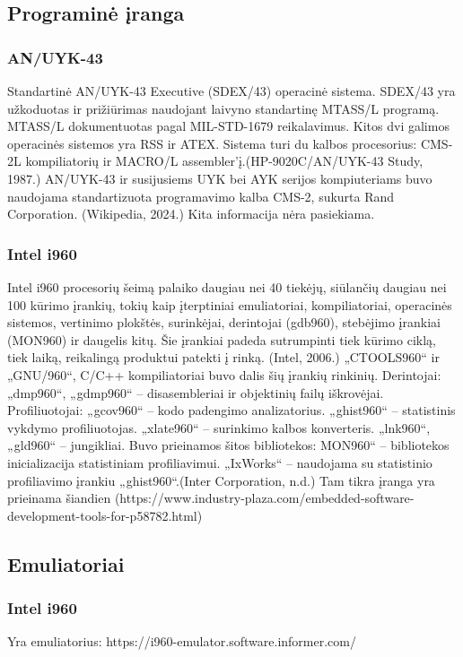 \documentclass{article}
\begin{document}
\subsection{Programinė įranga}
\subsubsection{AN/UYK-43}
Standartinė AN/UYK-43 Executive (SDEX/43) operacinė sistema. SDEX/43 yra
užkoduotas ir prižiūrimas naudojant laivyno standartinę MTASS/L programą. MTASS/L dokumentuotas pagal MIL-STD-1679 reikalavimus. Kitos dvi galimos operacinės sistemos yra RSS ir ATEX. Sistema turi du kalbos
procesorius: CMS-2L kompiliatorių ir MACRO/L assembler'į.(HP-9020C/AN/UYK-43 Study, 1987.) AN/UYK-43 ir susijusiems UYK bei AYK serijos kompiuteriams buvo naudojama standartizuota programavimo kalba CMS-2, sukurta Rand Corporation. (Wikipedia, 2024.) Kita informacija nėra pasiekiama.
\subsubsection{Intel i960}
Intel i960 procesorių šeimą palaiko daugiau nei 40 tiekėjų, siūlančių daugiau nei 100 kūrimo įrankių, tokių kaip įterptiniai emuliatoriai, kompiliatoriai, operacinės sistemos, vertinimo plokštės, surinkėjai, derintojai (gdb960), stebėjimo įrankiai (MON960) ir daugelis kitų. Šie įrankiai padeda sutrumpinti tiek kūrimo ciklą, tiek laiką, reikalingą produktui patekti į rinką. (Intel, 2006.) „CTOOLS960“ ir „GNU/960“, C/C++ kompiliatoriai buvo dalis šių įrankių rinkinių.  Derintojai: „dmp960“, „gdmp960“ – disasembleriai ir objektinių failų iškrovėjai. Profiliuotojai: „gcov960“ – kodo padengimo analizatorius. „ghist960“ – statistinis vykdymo profiliuotojas. „xlate960“ – surinkimo kalbos konverteris. „lnk960“, „gld960“ – jungikliai. Buvo prieinamos šitos bibliotekos: MON960“ – bibliotekos inicializacija statistiniam profiliavimui. „IxWorks“ – naudojama su statistinio profiliavimo įrankiu „ghist960“.(Inter Corporation, n.d.) Tam tikra įranga yra prieinama šiandien (https://www.industry-plaza.com/embedded-software-development-tools-for-p58782.html)
\subsection{Emuliatoriai}
\subsubsection{Intel i960}
Yra emuliatorius: https://i960-emulator.software.informer.com/
\end{document}
